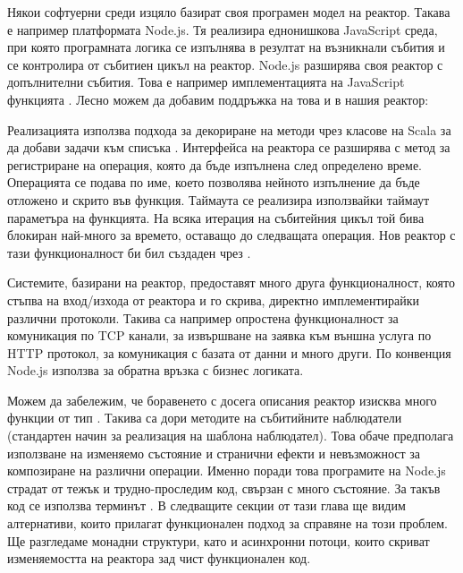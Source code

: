Някои софтуерни среди изцяло базират своя програмен модел на реактор. Такава е например платформата Node.js. Тя реализира еднонишкова JavaScript среда, при която програмната логика се изпълнява в резултат на възникнали събития и се контролира от събитиен цикъл на реактор. Node.js разширява своя реактор с допълнителни събития. Това е например имплементацията на JavaScript функцията . Лесно можем да добавим поддръжка на това и в нашия реактор:



Реализацията използва подхода за декориране на методи чрез  класове на Scala за да добави задачи към списъка . Интерфейса на реактора се разширява с метод за регистриране на операция, която да бъде изпълнена след определено време. Операцията се подава по име, което позволява нейното изпълнение да бъде отложено и скрито във функция. Таймаута се реализира използвайки таймаут параметъра на  функцията. На всяка итерация на събитейния цикъл той бива блокиран най-много за времето, оставащо до следващата операция. Нов реактор с тази функционалност би бил създаден чрез .

Системите, базирани на реактор, предоставят много друга функционалност, която стъпва на вход/изхода от реактора и го скрива, директно имплементирайки различни протоколи. Такива са например опростена функционалност за комуникация по TCP канали, за извършване на заявка към външна услуга по HTTP протокол, за комуникация с базата от данни и много други. По конвенция Node.js използва  за обратна връзка с бизнес логиката.

Можем да забележим, че боравенето с досега описания реактор изисква много  функции от тип . Такива са дори методите на събитийните наблюдатели (стандартен начин за реализация на шаблона наблюдател). Това обаче предполага използване на изменяемо състояние и странични ефекти и невъзможност за композиране на различни операции. Именно поради това програмите на Node.js страдат от тежък и трудно-проследим код, свързан с много състояние. За такъв код се използва терминът . В следващите секции от тази глава ще видим алтернативи, които прилагат функционален подход за справяне на този проблем. Ще разгледаме монадни структури, като  и асинхронни потоци, които скриват изменяемостта на реактора зад чист функционален код.

